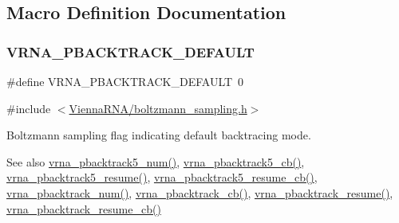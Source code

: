 \subsection{Macro Definition Documentation}
\mbox{\label{group__subopt__stochbt_ga760aa2fb2d5e3d7521a11454a21e9b9f}} 
\subsubsection{\texorpdfstring{VRNA\_PBACKTRACK\_DEFAULT}{VRNA\_PBACKTRACK\_DEFAULT}}
{\footnotesize\ttfamily \#define V\+R\+N\+A\+\_\+\+P\+B\+A\+C\+K\+T\+R\+A\+C\+K\+\_\+\+D\+E\+F\+A\+U\+LT~0}



{\ttfamily \#include $<$\mbox{\hyperlink{boltzmann__sampling_8h}{Vienna\+R\+N\+A/boltzmann\+\_\+sampling.\+h}}$>$}



Boltzmann sampling flag indicating default backtracing mode. 

\begin{DoxySeeAlso}{See also}
\mbox{\hyperlink{group__subopt__stochbt_ga30c3ddff868c44eecfdb07d99a2422ba}{vrna\+\_\+pbacktrack5\+\_\+num()}}, \mbox{\hyperlink{group__subopt__stochbt_ga626beb5b5b962d7e7c8433cd2cfd4e93}{vrna\+\_\+pbacktrack5\+\_\+cb()}}, \mbox{\hyperlink{group__subopt__stochbt_gac5d7065196975b803daeb4e094ba1cb9}{vrna\+\_\+pbacktrack5\+\_\+resume()}}, \mbox{\hyperlink{group__subopt__stochbt_ga4a91dc092580faf7799476e8dd76e0ac}{vrna\+\_\+pbacktrack5\+\_\+resume\+\_\+cb()}}, \mbox{\hyperlink{group__subopt__stochbt_ga596ed9bcd86f629a7c7c59c58b297db5}{vrna\+\_\+pbacktrack\+\_\+num()}}, \mbox{\hyperlink{group__subopt__stochbt_ga843fa953a15337b15cc68401adad84d7}{vrna\+\_\+pbacktrack\+\_\+cb()}}, \mbox{\hyperlink{group__subopt__stochbt_gae175129ece546fe7c092f27072e039d1}{vrna\+\_\+pbacktrack\+\_\+resume()}}, \mbox{\hyperlink{group__subopt__stochbt_ga6fc5ce952995e53baef52cad5581c063}{vrna\+\_\+pbacktrack\+\_\+resume\+\_\+cb()}} 
\end{DoxySeeAlso}
\mbox{\label{group__subopt__stochbt_ga9d580ce645aa0c38b69afdf56c332200}} 
